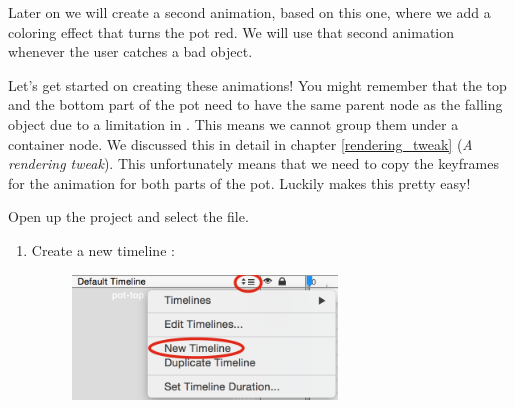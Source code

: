Later on we will create a second animation, based on this one, where we add a
coloring effect that turns the pot red. We will use that second animation
whenever the user catches a bad object.

Let's get started on creating these animations! You might remember that the top
and the bottom part of the pot need to have the same parent node as the falling
object due to a limitation in \cocos{}. This means we cannot group them under
a container node. We discussed this in detail in chapter \ref{rendering_tweak}
(\textit{A rendering tweak}). This unfortunately means that we need to copy the
keyframes for the animation for both parts of the pot. Luckily \SB{} makes this
pretty easy!
\begin{leftbar}
Open up the \SB{} project and select the  file. 
\begin{enumerate}
  \item Create a new timeline :
  \begin{figure}[H]
  \centering
  \includegraphics[width=200pt]{images/Chapter9/timeline_new.png}
  \end{figure} 
 

\end{enumerate}
\end{leftbar}
